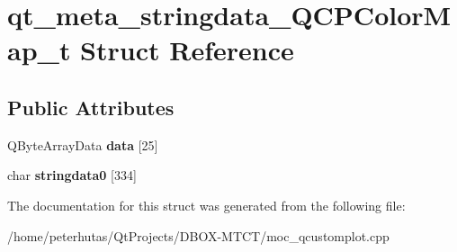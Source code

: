 \hypertarget{structqt__meta__stringdata___q_c_p_color_map__t}{}\section{qt\+\_\+meta\+\_\+stringdata\+\_\+\+Q\+C\+P\+Color\+Map\+\_\+t Struct Reference}
\label{structqt__meta__stringdata___q_c_p_color_map__t}
\subsection*{Public Attributes}
\begin{DoxyCompactItemize}
\item 
\mbox{\label{structqt__meta__stringdata___q_c_p_color_map__t_accab0e8d36920ac71eecd79ccaa7badf}} 
Q\+Byte\+Array\+Data {\bfseries data} \mbox{[}25\mbox{]}
\item 
\mbox{\label{structqt__meta__stringdata___q_c_p_color_map__t_a2edec26054af0f1b2cc81406b21fca92}} 
char {\bfseries stringdata0} \mbox{[}334\mbox{]}
\end{DoxyCompactItemize}


The documentation for this struct was generated from the following file\+:\begin{DoxyCompactItemize}
\item 
/home/peterhutas/\+Qt\+Projects/\+D\+B\+O\+X-\/\+M\+T\+C\+T/moc\+\_\+qcustomplot.\+cpp\end{DoxyCompactItemize}
